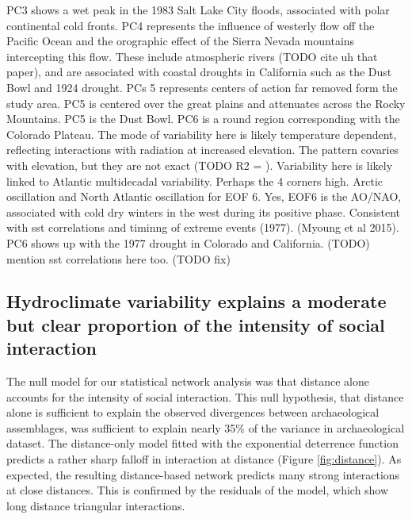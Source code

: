 \documentclass[10pt]{iopart}
\begin{document}
PC3 shows a wet peak in the 1983 Salt Lake City floods, associated with polar continental cold fronts. PC4 represents the influence of westerly flow off the Pacific Ocean and the orographic effect of the Sierra Nevada mountains intercepting this flow. These include atmospheric rivers (TODO cite uh that paper), and are associated with coastal droughts in California such as the Dust Bowl and 1924 drought. PCs 5 represents centers of action far removed form the study area. PC5 is centered over the great plains and attenuates across the Rocky Mountains. PC5 is the Dust Bowl. PC6 is a round region corresponding with the Colorado Plateau. The mode of variability here is likely temperature dependent, reflecting interactions with radiation at increased elevation. The pattern covaries with elevation, but they are not exact (TODO R2 = ). Variability here is likely linked to Atlantic multidecadal variability. Perhaps the 4 corners high. Arctic oscillation and North Atlantic oscillation for EOF 6. Yes, EOF6 is the AO/NAO, associated with cold dry winters in the west during its positive phase. Consistent with sst correlations and timinng of extreme events (1977). (Myoung et al 2015). PC6 shows up with the 1977 drought in Colorado and California. (TODO) mention sst correlations here too. (TODO fix)


\subsection*{Hydroclimate variability explains a moderate but clear proportion of the intensity of social interaction}
The null model for our statistical network analysis was that distance alone accounts for the intensity of social interaction. This null hypothesis, that distance alone is sufficient to explain the observed divergences between archaeological assemblages, was sufficient to explain nearly 35\% of the variance in archaeological dataset. The distance-only model fitted with the exponential deterrence function predicts a rather sharp falloff in interaction at distance (Figure \ref{fig:distance}). As expected, the resulting distance-based network predicts many strong interactions at close distances. This is confirmed by the residuals of the model, which show long distance triangular interactions.
\end{document}
